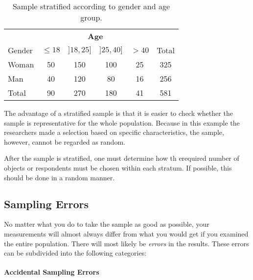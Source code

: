 \begin{table}
    \centering
    \begin{tabular}{l|cccc|c}
        & \multicolumn{4}{c|}{\textbf{Age}} & \\
        Gender & $\le 18$ & $]18,25]$ & $]25, 40]$ & $> 40$ & Total\\
        \hline
        Woman & 50 & 150 & 100 & 25 & 325 \\
        Man   & 40 & 120 & 80 & 16 & 256\\
        \hline
        Total & 90 & 270 & 180 & 41 & 581
    \end{tabular}
    \caption{Sample stratified according to gender and age group.}
    \label{tab:frequenties-steekproef}
\end{table}

The advantage of a stratified sample is that it is easier to check whether the sample is representative for the whole population. 
Because in this example the researchers made a selection based on specific characteristics, the sample, however, cannot be regarded as random.

After the sample is stratified, one must determine how th erequired number of objects or respondents must be chosen within each stratum. If possible, this should be done in a random manner.



\subsection{Sampling Errors}

No matter what you do to take the sample as good as possible, your measurements will almost always differ from what you would get if you examined the entire population. There will most likely be \emph{errors} in the results. These errors can be subdivided into the following categories:


\paragraph{Accidental Sampling Errors}

